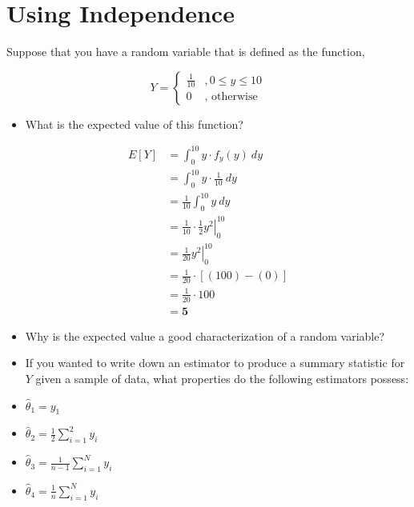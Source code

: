 \documentclass[
]{book}
\providecommand{\tightlist}{%
  \setlength{\itemsep}{0pt}\setlength{\parskip}{0pt}}
\begin{document}
\hypertarget{using-independence}{%
\section{Using Independence}\label{using-independence}}

Suppose that you have a random variable that is defined as the function,

\[
Y = 
  \begin{cases}
    \frac{1}{10} & ,0 \leq y \leq 10 \\ 
    0 & \text{, otherwise}
  \end{cases}
\]

\begin{itemize}
\tightlist
\item
  What is the expected value of this function?
\end{itemize}

\[
\begin{aligned}
  E[Y]  &= \int_{0}^{10} y \cdot f_{y}(y) \ dy                       \\ 
        &= \int_{0}^{10} y \cdot \frac{1}{10} \ dy                   \\ 
        &= \frac{1}{10}\int_{0}^{10} y \ dy                          \\ 
        &= \left.\frac{1}{10} \cdot \frac{1}{2}  y^2\right|_{0}^{10} \\ 
        &= \left.\frac{1}{20}  y^{2} \right|_{0}^{10}                \\ 
        &= \frac{1}{20} \cdot \left[(100) - (0) \right]              \\ 
        &= \frac{1}{20} \cdot 100                                    \\
        &= \mathbf{5}
\end{aligned}
\]

\begin{itemize}
\item
  Why is the expected value a good characterization of a random
  variable?
\item
  If you wanted to write down an estimator to produce a summary
  statistic for \(Y\) given a sample of data, what properties do the
  following estimators possess:
\item
  \(\hat{\theta}_{1} = y_{1}\)
\item
  \(\hat{\theta}_{2} = \frac{1}{2} \displaystyle\sum_{i=1}^{2} y_{i}\)
\item
  \(\hat{\theta}_{3} = \frac{1}{n-1} \displaystyle\sum_{i=1}^{N} y_{i}\)
\item
  \(\hat{\theta}_{4} = \frac{1}{n} \displaystyle\sum_{i=1}^{N} y_{i}\)
\end{itemize}
\end{document}
